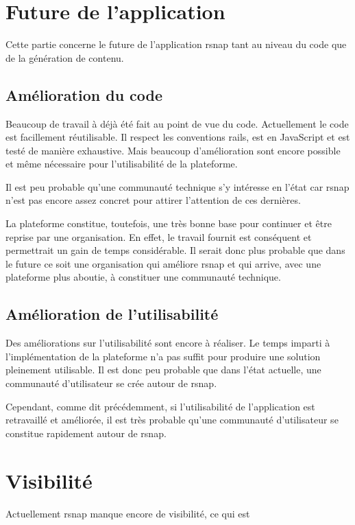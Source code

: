\section{Future de l'application}
Cette partie concerne le future de l'application \gls{rsnap} tant au niveau du code que de la génération de contenu.

\subsection{Amélioration du code}
Beaucoup de travail à déjà été fait au point de vue du code. Actuellement le code est facillement réutilisable. Il respect les conventions \gls{rails}, est en JavaScript et est testé de manière exhaustive. Mais beaucoup d'amélioration sont encore possible et même nécessaire pour l'utilisabilité de la plateforme.

Il est peu probable qu'une communauté technique s'y intéresse en l'état car \gls{rsnap} n'est pas encore assez concret pour attirer l'attention de ces dernières.

La plateforme constitue, toutefois, une très bonne base pour continuer et être reprise par une organisation. En effet, le travail fournit est conséquent et permettrait un gain de temps considérable. Il serait donc plus probable que dans le future ce soit une organisation qui améliore \gls{rsnap} et qui arrive, avec une plateforme plus aboutie, à constituer une communauté technique.

\subsection{Amélioration de l'utilisabilité}
Des améliorations sur l'utilisabilité sont encore à réaliser. Le temps imparti à l'implémentation de la plateforme n'a pas suffit pour produire une solution pleinement utilisable. Il est donc peu probable que dans l'état actuelle, une communauté d'utilisateur se crée autour de \gls{rsnap}.

Cependant, comme dit précédemment, si l'utilisabilité de l'application est retravaillé et améliorée, il est très probable qu'une communauté d'utilisateur se constitue rapidement autour de \gls{rsnap}.

\section{Visibilité}
Actuellement \gls{rsnap} manque encore de visibilité, ce qui est 


%
%
%
%
%
%
